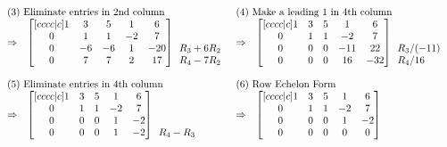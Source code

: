 \begin{example}
{$$\begin{array}{rlcl}
\\ \\
\multicolumn{2}{l}{\text{(3) Eliminate entries in 2nd column}}&
\multicolumn{2}{l}{\text{(4) Make a leading 1 in 4th column}}\\
\Rightarrow&
\begin{bmatrix}[cccc|c]
  1 & 3 & 5 & 1 & 6 \\
 0 & 1 & 1 & -2 & 7 \\
 0 & -6 & -6 & 1 & -20 \\
 0 & 7 & 7 & 2 & 17
\end{bmatrix}
  \begin{array}{lr} \ \\ \ \\ R_3+6R_2 \\ R_4-7R_2 \end{array}
&\Rightarrow& 
\begin{bmatrix}[cccc|c]
  1 & 3 & 5 & 1 & 6 \\
 0 & 1 & 1 & -2 & 7 \\
 0 & 0 & 0 & -11 & 22 \\
 0 & 0 & 0 & 16 & -32
\end{bmatrix}
  \begin{array}{lr} \ \\ \ \\ R_3/(-11) \\ R_4/16 \end{array}
\\ \\
\multicolumn{2}{l}{\text{(5) Eliminate entries in 4th column}}&
\multicolumn{2}{l}{\text{(6) Row Echelon Form}}\\
\Rightarrow&
\begin{bmatrix}[cccc|c]
  1 & 3 & 5 & 1 & 6 \\
 0 & 1 & 1 & -2 & 7 \\
 0 & 0 & 0 & 1 & -2 \\
 0 & 0 & 0 & 1 & -2
\end{bmatrix}
  \begin{array}{lr} \ \\ \ \\ \ \\ R_4-R_3 \end{array}
&\Rightarrow& 
\begin{bmatrix}[cccc|c]
  1 & 3 & 5 & 1 & 6 \\
 0 & 1 & 1 & -2 & 7 \\
 0 & 0 & 0 & 1 & -2 \\
 0 & 0 & 0 & 0 & 0
\end{bmatrix}

\end{array}$$}
\end{example}
